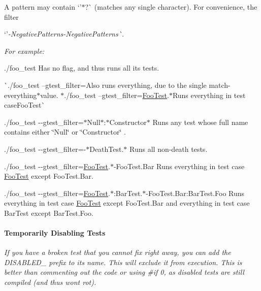 A pattern may contain `'$\ast$\textquotesingle{}?\textquotesingle{}\`{} (matches any single character). For convenience, the filter

`'{\itshape -\/Negative\+Patterns\textquotesingle{}-\/Negative\+Patterns\textquotesingle{}\`{}.}

{\itshape For example\+:}

{\itshape 
\begin{DoxyItemize}
\item {\ttfamily ./foo\+\_\+test} Has no flag, and thus runs all its tests.
\item \`{}./foo\+\_\+test --gtest\+\_\+filter={\ttfamily Also runs everything, due to the single match-\/everything}$\ast${\ttfamily value. $\ast$}./foo\+\_\+test --gtest\+\_\+filter=\mbox{\hyperlink{classFooTest}{Foo\+Test}}.$\ast${\ttfamily Runs everything in test case}Foo\+Test\`{}
\item {\ttfamily ./foo\+\_\+test -\/-\/gtest\+\_\+filter=$\ast$\+Null$\ast$\+:$\ast$\+Constructor$\ast$} Runs any test whose full name contains either {\ttfamily \char`\"{}\+Null\char`\"{}} or {\ttfamily \char`\"{}\+Constructor\char`\"{}} .
\item {\ttfamily ./foo\+\_\+test -\/-\/gtest\+\_\+filter=-\/$\ast$\+Death\+Test.$\ast$} Runs all non-\/death tests.
\item {\ttfamily ./foo\+\_\+test -\/-\/gtest\+\_\+filter=\mbox{\hyperlink{classFooTest}{Foo\+Test}}.$\ast$-\/\+Foo\+Test.Bar} Runs everything in test case {\ttfamily \mbox{\hyperlink{classFooTest}{Foo\+Test}}} except {\ttfamily Foo\+Test.\+Bar}.
\item {\ttfamily ./foo\+\_\+test -\/-\/gtest\+\_\+filter=\mbox{\hyperlink{classFooTest}{Foo\+Test}}.$\ast$\+:Bar\+Test.$\ast$-\/\+Foo\+Test.Bar\+:Bar\+Test.\+Foo} Runs everything in test case {\ttfamily \mbox{\hyperlink{classFooTest}{Foo\+Test}}} except {\ttfamily Foo\+Test.\+Bar} and everything in test case {\ttfamily Bar\+Test} except {\ttfamily Bar\+Test.\+Foo}.
\end{DoxyItemize}}

{\itshape \paragraph*{Temporarily Disabling Tests}}

{\itshape }

{\itshape If you have a broken test that you cannot fix right away, you can add the {\ttfamily D\+I\+S\+A\+B\+L\+E\+D\+\_\+} prefix to its name. This will exclude it from execution. This is better than commenting out the code or using {\ttfamily \#if 0}, as disabled tests are still compiled (and thus won\textquotesingle{}t rot).}

